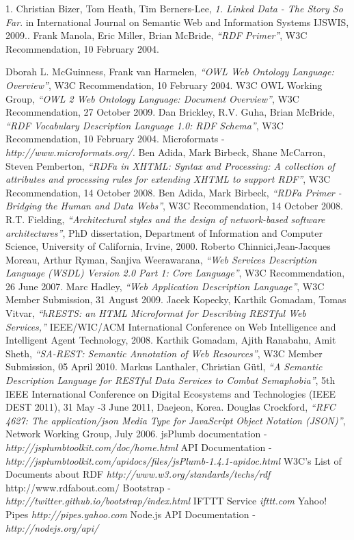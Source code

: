 \documentclass[12pt]{report}
\begin{document}
\begin{thebibliography}{9}

	1. Christian Bizer, Tom Heath, Tim Berners-Lee,
	\emph{1. Linked Data - The Story So Far}.
	in International Journal on Semantic Web and Information Systems IJSWIS, 2009..
	Frank Manola, Eric Miller, Brian McBride,
	\emph{“RDF Primer”},
	W3C Recommendation, 10 February 2004.

	Dborah L. McGuinness, Frank van Harmelen,
	\emph{“OWL Web Ontology Language: 	Overview”},
	W3C Recommendation, 10 February 2004.
	W3C OWL Working Group,
	\emph{“OWL 2 Web Ontology Language: Document Overview”},
	W3C Recommendation, 27 October 2009.
	Dan Brickley, R.V. Guha, Brian McBride,
	\emph{“RDF Vocabulary Description Language 1.0: 	RDF Schema”},
	W3C Recommendation, 10 February 2004.
	Microformats -
	\emph{http://www.microformats.org/.}
	Ben Adida, Mark Birbeck, Shane McCarron, Steven Pemberton,
	\emph{“RDFa in XHTML: 	Syntax and Processing: A collection of attributes and processing rules for extending 	XHTML to support RDF”},
	W3C Recommendation, 14 October 2008.
	Ben Adida, Mark Birbeck,
	\emph{“RDFa Primer - Bridging the Human and Data Webs”},
	W3C 	Recommendation, 14 October 2008.
	R.T. Fielding,
	\emph{“Architectural styles and the design of network-based software       	architectures”},
	PhD dissertation, Department of Information and Computer Science, 	University of California, Irvine, 2000.
	Roberto Chinnici,Jean-Jacques Moreau, Arthur Ryman, Sanjiva Weerawarana,
	\emph{“Web 	Services Description Language (WSDL) Version 2.0 Part 1: Core Language”},
	W3C 	Recommendation, 26 June 2007.
	Marc Hadley,
	\emph{“Web Application Description Language”},
	W3C Member Submission, 31 	August 2009.
	Jacek Kopecky, Karthik Gomadam, Tomas Vitvar,
	\emph{“hRESTS: an HTML Microformat for 	Describing RESTful Web Services,”} IEEE/WIC/ACM International Conference on Web 	Intelligence and Intelligent Agent Technology, 2008.
	Karthik Gomadam, Ajith Ranabahu, Amit Sheth,
	\emph{“SA-REST: Semantic Annotation of 	Web Resources”},
	W3C Member Submission, 05 April 2010.
	Markus Lanthaler, Christian Gütl,
	\emph{“A Semantic Description Language for RESTful Data 	Services to Combat Semaphobia”},
	5th IEEE International Conference on Digital 	Ecosystems and Technologies (IEEE DEST 2011), 31 May -3 June 2011, Daejeon, Korea.
	Douglas Crockford,
	\emph{“RFC 4627: The application/json Media Type for JavaScript Object 	Notation (JSON)”},
	Network Working Group, July 2006.
	jsPlumb documentation -
	\emph{http://jsplumbtoolkit.com/doc/home.html}
	API Documentation -
	\emph{http://jsplumbtoolkit.com/apidocs/files/jsPlumb-1.4.1-apidoc.html}
	W3C's List of Documents about RDF
	\emph{http://www.w3.org/standards/techs/rdf}
	http://www.rdfabout.com/
	Bootstrap -
	\emph{http://twitter.github.io/bootstrap/index.html}
	IFTTT Service
	\emph{ifttt.com}
	Yahoo! Pipes
	\emph{http://pipes.yahoo.com}
	Node.js API Documentation -
	\emph{http://nodejs.org/api/}




\end{thebibliography}
\end{document}
